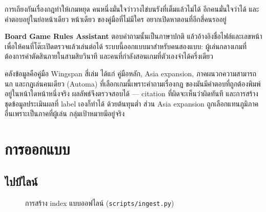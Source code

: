 \documentclass[11pt,a4paper]{article}
\newcommand{\code}[1]{\texttt{\small #1}}
\begin{document}
การเถียงกันเรื่องกฎทำให้เกมหยุด คนหนึ่งมั่นใจว่าวางไข่บนรังที่เต็มแล้วไม่ได้
อีกคนมั่นใจว่าได้ และคำตอบอยู่ในย่อหน้าเดียว หน้าเดียว ของคู่มือที่ไม่มีใคร
อยากเปิดหาตอนที่อีกสี่คนรออยู่

\textbf{Board Game Rules Assistant} ตอบคำถามนั้นเป็นภาษาปกติ
แล้วอ้างอิงชื่อไฟล์และเลขหน้า เพื่อให้คนที่โต๊ะเปิดตรวจแล้วเล่นต่อได้
ระบบนี้ออกแบบมาสำหรับคนสองแบบ: ผู้เล่นกลางเกมที่ต้องการคำตัดสินภายในสามสิบวินาที
และคนที่กำลังสอนเกมที่ตัวเองจำได้ครึ่งเดียว

คลังข้อมูลคือคู่มือ Wingspan สี่เล่ม ได้แก่ คู่มือหลัก, Asia expansion,
ภาคผนวกความสามารถนก และกฎเล่นคนเดียว (Automa) ที่เลือกเกมนี้เพราะคำถามเรื่องกฎ
ของมันมีคำตอบที่ถูกต้องพิมพ์อยู่ในหน้าใดหน้าหนึ่งจริง ผลลัพธ์จึงตรวจสอบได้ ---
citation ที่ผิดจะเห็นว่าผิดทันที และการสร้างชุดข้อมูลประเมินผลที่ label เองก็ทำได้
ด้วยต้นทุนต่ำ ส่วน Asia expansion ถูกเลือกแทนภูมิภาคอื่นเพราะเป็นภาคที่ผู้เล่น
กลุ่มเป้าหมายมีอยู่จริง

\section{การออกแบบ}

\subsection{ไปป์ไลน์}

\begin{figure}[H]
\centering
{}
\caption{การสร้าง index แบบออฟไลน์ (\code{scripts/ingest.py})}
\end{figure}
\end{document}
